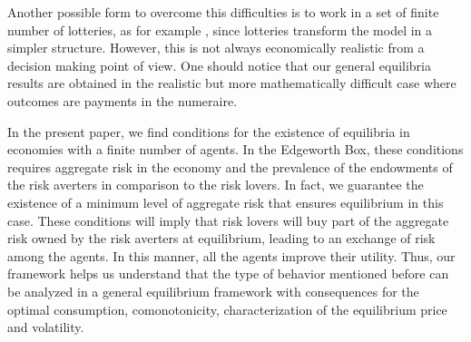 \documentclass[pdftex]{article}
\numberwithin{equation}{section}
\theoremstyle{th}
\newtheorem{proof lemma}{{Proof Lemma}.}
\theoremstyle{definition}
\newtheorem*{risk lovers}{Risk lovers}
\newtheorem*{risk averse}{Risk averse}
\begin{document}
{Another possible form to overcome this difficulties is to work in a set of finite number of lotteries, as for example \cite{SnowWolf}, since lotteries transform the model in a simpler structure. However, this is not always economically realistic from a decision making point of view.} One should notice that our general equilibria results are obtained in the realistic but more {mathematically difficult case where outcomes are payments in the numeraire.}




In the present paper, we find conditions for the existence of equilibria in economies with a finite number of agents. In the Edgeworth Box, these conditions requires aggregate risk in the economy and the prevalence of the endowments of the risk averters in comparison to the risk lovers. In fact, we guarantee the existence of a minimum level of aggregate risk that ensures equilibrium in this case.
These conditions will imply that risk lovers will buy part of the aggregate risk owned by the risk averters at equilibrium, leading to an exchange of risk among the agents. In this manner, all the agents improve their utility. Thus, our framework helps us understand that the type of behavior mentioned before can be analyzed in a general equilibrium framework with consequences for the optimal consumption, comonotonicity, characterization of the equilibrium price and volatility.


\end{document}

